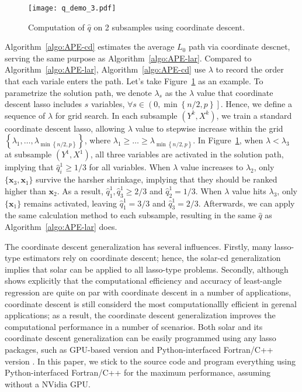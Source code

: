 \documentclass[12pt]{article}
\begin{document}
\begin{figure}[h]
  \centering
  \texttt{[image: q\_demo\_3.pdf]}
  \caption{Computation of $\widehat{q}$ on 2 subsamples using coordinate descent.}
  \label{fig:q_demo_3}
\end{figure}

Algorithm~\ref{algo:APE-cd} estimates the average $L_0$ path via coordinate descnet, serving the same purpose as Algorithm~\ref{algo:APE-lar}. Compared to Algorithm~\ref{algo:APE-lar}, Algorithm~\ref{algo:APE-cd} use $\lambda$ to record the order that each variale enters the path. Let's take Figure~\ref{fig:q_demo_3} as an example. To parametrize the solution path, we denote $\lambda_s$ as the $\lambda$ value that coordinate descent lasso includes $s$ variables, $\forall s\in \left( 0, \min \left\{ n/2, p \right\} \right]$. Hence, we define a sequence of $\lambda$ for grid search. In each subsample $\left( Y^k, X^k \right)$, we train a standard coordinate descent lasso, allowing $\lambda$ value to stepwise increase within the grid $\left\{\lambda_1, \ldots, \lambda_{ \min \left\{ n/2, p \right\} } \right\}$, where $\lambda_1 \geqslant \ldots \geqslant \lambda_{ \min \left\{ n/2, p \right\} }$. In Figure~\ref{fig:q_demo_3}, when $\lambda < \lambda_3$ at subsample $\left( Y^1, X^1 \right)$, all three variables are activated in the solution path, implying that $\widehat{q}^1_i \geqslant 1/3$ for all variables. When $\lambda$ value increases to $\lambda_2$, only $\{\mathbf{x}_3, \mathbf{x}_1\}$ survive the harsher shrinkage, implying that they should be ranked higher than $\mathbf{x}_2$. As a result, $\widehat{q}^1_1, \widehat{q}^1_3 \geqslant 2/3$ and $\widehat{q}^1_2 = 1/3$. When $\lambda$ value hits $\lambda_3$, only $\{\mathbf{x}_1\}$ remains activated, leaving $\widehat{q}^1_1 = 3/3$ and $\widehat{q}^1_3 = 2/3$. Afterwards, we can apply the same calculation method to each subsample, resulting in the same $\widehat{q}$ as Algorithm~\ref{algo:APE-lar} does. 

The coordinate descent generalization has several influences. Firstly, many lasso-type estimators rely on coordinate descent; hence, the solar-cd generalization implies that solar can be applied to all lasso-type problems. Secondly, although \cite{tibshirani2015general} shows explicitly that the computational efficiency and accuracy of least-angle regression are quite on par with coordinate descent in a number of applications, coordinate descent is still considerd the most computationallly efficient in gerenal applications; as a result, the coordinate descent generalization improves the computational performance in a number of scenarios. Both solar and its coordinate descent generalization can be easily programmed using any lasso packages, such as GPU-based version \citep{fujiwara2016fast} and Python-interfaced Fortran/C++ version \citep{scikit-learn}. In this paper, we stick to the \citet{scikit-learn} source code and program everything using Python-interfaced Fortran/C++ for the maximum performance, assuming without a NVidia GPU.
\end{document}
